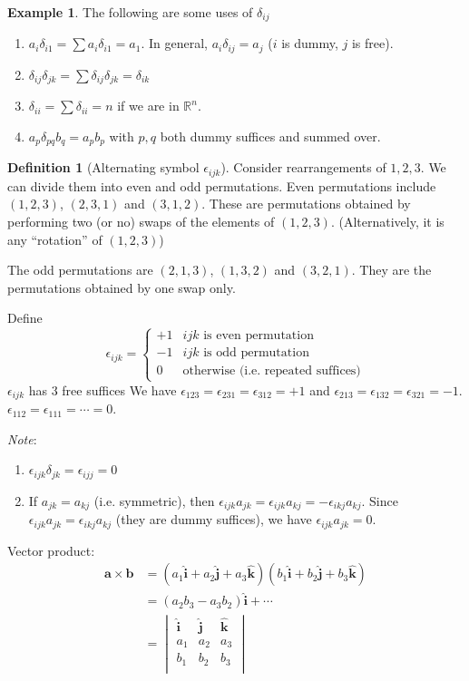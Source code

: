 \documentclass[a4paper]{article}
\theoremstyle{definition}
\newtheorem*{defi}{Definition}
\newtheorem*{eg}{Example}
\newcommand{\mb}[1]{\mathbf{#1}}
\newcommand{\note}{\noindent \emph{Note}:\;}
\newcommand{\R}{\mathbb{R}}
\begin{document}
\begin{eg}
  The following are some uses of $\delta_{ij}$
  \begin{enumerate}
  \item $a_i\delta_{i1} = \sum a_i\delta_{i1} = a_1$. In general, $a_i\delta_{ij} = a_j$ ($i$ is dummy, $j$ is free).
  \item $\delta_{ij}\delta_{jk} = \sum\delta_{ij}\delta_{jk} = \delta_{ik}$
  \item $\delta_{ii} = \sum \delta_{ii} = n$ if we are in $\R^n$.
  \item $a_p\delta_{pq}b_q = a_pb_p$ with $p, q$ both dummy suffices and summed over.
  \end{enumerate}
\end{eg}

\begin{defi}[Alternating symbol $\epsilon_{ijk}$]
  Consider rearrangements of $1, 2, 3$. We can divide them into even and odd permutations. Even permutations include $(1, 2, 3)$, $(2, 3, 1)$ and $(3, 1, 2)$. These are permutations obtained by performing two (or no) swaps of the elements of $(1, 2, 3)$. (Alternatively, it is any ``rotation'' of $(1, 2, 3)$)

  The odd permutations are $(2, 1, 3)$, $(1, 3, 2)$ and $(3, 2, 1)$. They are the permutations obtained by one swap only.

  Define
  \[
  \epsilon_{ijk} =
  \begin{cases}
    +1 & ijk \text{ is even permutation}\\
    -1 & ijk\text{ is odd permutation}\\
    0 & \text{otherwise (i.e. repeated suffices)}
  \end{cases}
  \]
  $\epsilon_{ijk}$ has 3 free suffices
 We have $\epsilon_{123} = \epsilon_{231} = \epsilon_{312} = +1$ and $\epsilon_{213} = \epsilon_{132} = \epsilon_{321} = -1$. $\epsilon_{112} = \epsilon_{111} = \cdots = 0$.
\end{defi}
\note
\begin{enumerate}
\item $\epsilon_{ijk}\delta_{jk} = \epsilon_{ijj} = 0$
\item If $a_{jk} = a_{kj}$ (i.e. symmetric), then $\epsilon_{ijk}a_{jk} = \epsilon_{ijk}a_{kj} = -\epsilon_{ikj}a_{kj}$. Since $\epsilon_{ijk}a_{jk} = \epsilon_{ikj}a_{kj}$ (they are dummy suffices), we have $\epsilon_{ijk}a_{jk} = 0$.
\end{enumerate}

Vector product:
\begin{align*}
\mb{a\times b} &= (a_1\hat{\mb{i}} + a_2\hat{\mb{j}} + a_3\hat{\mb{k}})(b_1\hat{\mb{i}} + b_2\hat{\mb{j}} + b_3\hat{\mb{k}})\\
&= (a_2b_3 - a_3b_2)\hat{\mb{i}} + \cdots\\
&= \begin{vmatrix} \hat{\mb{i}} & \hat{\mb{j}} & \hat{\mb{k}}\\
  a_1 & a_2 & a_3\\
  b_1 & b_2 & b_3\\
\end{vmatrix}
\end{align*}
\end{document}
